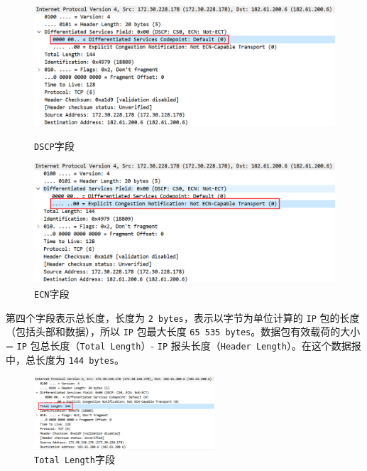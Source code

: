 \documentclass{article}
\begin{document}
\begin{figure}[H]
  \centering
  \begin{minipage}[t]{0.48\textwidth}
    \centering
    \includegraphics[width=\textwidth]{img/10.png}
    \caption{\texttt{DSCP}字段}
    \label{fig:8}
  \end{minipage}
  \begin{minipage}[t]{0.48\textwidth}
    \centering
    \includegraphics[width=\textwidth]{img/11.png}
    \caption{\texttt{ECN}字段}
    \label{fig:9}
  \end{minipage}
\end{figure}

第四个字段表示总长度，长度为 \texttt{2 bytes}，表示以字节为单位计算的 \texttt{IP} 包的长度（包括头部和数据），所以 \texttt{IP} 包最大长度 \texttt{65 535 bytes}。数据包有效载荷的大小 = \texttt{IP} 包总长度（\texttt{Total Length}）- \texttt{IP} 报头长度（\texttt{Header Length}）。在这个数据报中，总长度为 \texttt{144 bytes}。


\begin{figure}[H]
  \centering
  \includegraphics[width=0.6\textwidth]{img/12.png}
  \caption{\texttt{Total Length}字段}
  \label{fig:10}
\end{figure}
\end{document}
